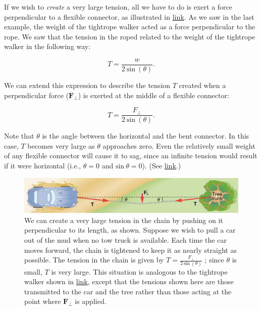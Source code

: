 \documentclass[
]{book}
\begin{document}
If we wish to \emph{create} a very large tension, all we have to do is exert
a force perpendicular to a flexible connector, as illustrated in
\protect\hyperlink{import-auto-id2847184}{link}. As we saw in the
last example, the weight of the tightrope walker acted as a force
perpendicular to the rope. We saw that the tension in the roped related
to the weight of the tightrope walker in the following way:

\leavevmode\hypertarget{eip-id2294185}{}%
\[{T = \frac{w}{2\ \text{sin}\ (\theta)}}.\]

We can extend this expression to describe the tension \(T{}\) created when
a perpendicular force (\(\textbf{F}_{\bot}{}\)) is exerted at the middle
of a flexible connector:

\leavevmode\hypertarget{eip-id1535477}{}%
\[{T = \frac{F_{\bot}}{2\ \text{sin}\ (\theta)}}.\]

Note that \(\theta{}\) is the angle between the horizontal and the bent
connector. In this case, \(T{}\) becomes very large as \(\theta{}\)
approaches zero. Even the relatively small weight of any flexible
connector will cause it to sag, since an infinite tension would result
if it were horizontal (i.e., \({\theta = 0}{}\) and
\({\text{sin}{\ \theta = 0}}{}\)). (See
\protect\hyperlink{import-auto-id2847184}{link}.)

\begin{figure}
\hypertarget{import-auto-id2847184}{%
\centering
\includegraphics{images/Figure_04_05_08.jpg}
\caption{We can create a very large tension in the chain by pushing on it
perpendicular to its length, as shown. Suppose we wish to pull a car out
of the mud when no tow truck is available. Each time the car moves
forward, the chain is tightened to keep it as nearly straight as
possible. The tension in the chain is given by
\({T = \frac{F_{\bot}}{2\ \text{sin}\ (\theta)}}{}\) ; since \(\theta{}\) is
small, \(T{}\) is very large. This situation is analogous to the tightrope
walker shown in \protect\hyperlink{import-auto-id2091042}{link},
except that the tensions shown here are those transmitted to the car and
the tree rather than those acting at the point where
\(\textbf{F}_{\bot}{}\) is
applied.}\label{import-auto-id2847184}
}
\end{figure}
\end{document}
